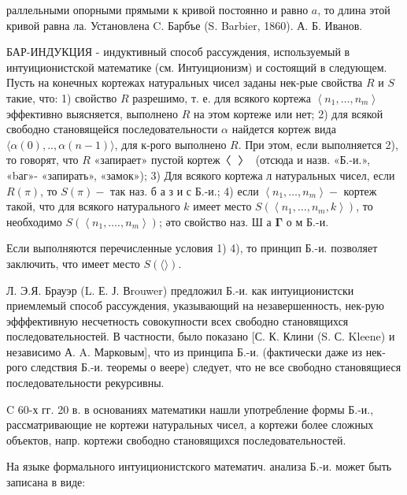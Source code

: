 \documentclass[10pt]{article}
\begin{document}
раллельными опорными прямыми к кривой постоянно и равно $a$, то длина этой кривой равна ла. Установлена C. Барбъе (S. Barbier, 1860). А. Б. Иванов.



БАР-ИНДУКЦИЯ - индуктивный способ рассуждения, используемый в интуиционистской математике (см. Интуиционизм) и состоящий в следующем. Пусть на конечных кортежах натуральных чисел заданы нек-рые свойства $R$ и $S$ такие, что: 1) свойство $R$ разрешимо, т. е. для всякого кортежа $\left\langle n_{1}, \ldots, n_{m}\right\rangle$ эффективно выясняется, выполнено $R$ на этом кортеже или нет; 2) для всякой свободно становящейся последовательности $\alpha$ найдется кортеж вида $\langle\alpha(0), . ., \alpha(n-1)\rangle$, для к-рого выполнено $R$. При этом, если выполняется 2), то говорят, что $R$ «запирает» пустой кортеж〈 $〉$ (отсюда и назв. «Б.-и.», «bаг»- «запирать», «замок»); 3) Для всякого кортежа л натуральных чисел, если $R(\pi)$, то $S(\pi)-$ так наз. б а $з$ и с Б.-и.; 4) если $\left\langle n_{1}, \ldots, n_{m}\right\rangle-$ кортеж такой, что для всякого натурального $k$ имеет место $S\left(\left\langle n_{1}, \ldots, n_{m}, k\right\rangle\right)$, то необходимо $S\left(\left\langle n_{1}, \ldots ., n_{m}\right\rangle\right)$; әто свойство наз. Ш а $\mathbf{\Gamma}$ о м Б.-и.



Если выполняются перечисленные условия 1) 4), то принцип Б.-и. позволяет заключить, что имеет место $S(\langle\rangle)$.



Л. Э.Я. Брауэр (L. Е. Ј. Вrouwer) предложил Б.-и. как интуиционистски приемлемый способ рассуждения, указывающий на незавершенность, нек-рую эфффективную несчетность совокупности всех свободно становящихся последовательностей. В частности, было показано [С. К. Клини (S. С. Kleene) и независимо А. A. Марковым], что из принципа Б.-и. (фактически даже из нек-рого следствия Б.-и. теоремы о веере) следует, что не все свободно становящиеся последовательности рекурсивны.



C 60-х гг. 20 в. в основаниях математики нашли употребление формы Б.-и., рассматривающие не кортежи натуральных чисел, а кортежи более сложных объектов, напр. кортежи свободно становящихся последовательностей.



На языке формального интуиционистского математич. анализа Б.-и. может быть записана в виде:
\end{document}
